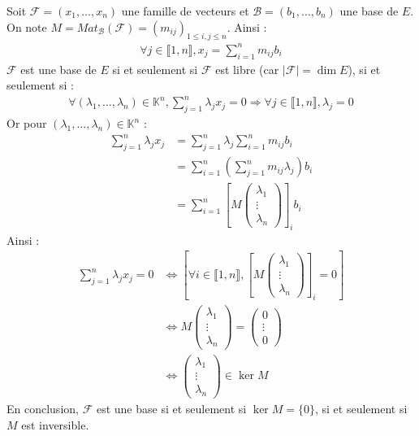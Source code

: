 \documentclass[../main.tex]{subfiles}
\begin{document}
\noindent Soit $\mathcal{F} = (x_1, \ldots, x_n)$ une famille de vecteurs et $\mathcal{B} = (b_1, \ldots, b_n)$ une base de $E$. \\
On note $M = Mat_{\mathcal{B}}(\mathcal{F}) = (m_{ij})_{1\leq i,j\leq n}$. Ainsi :
\begin{align*}
    \forall j\in \llbracket 1, n \rrbracket, x_j = \sum_{i=1}^n m_{ij} b_i
\end{align*}
$\mathcal{F}$ est une base de $E$ si et seulement si $\mathcal{F}$ est libre (car $|\mathcal{F}| = \dim E$), si et seulement si : 
\begin{align*}
    \forall (\lambda_1, \ldots, \lambda_n)\in \mathbb{K}^n, \sum_{j=1}^n \lambda_j x_j = 0 \Rightarrow \forall j\in \llbracket 1, n \rrbracket, \lambda_j = 0
\end{align*}
Or pour $(\lambda_1, \ldots, \lambda_n)\in \mathbb{K}^n$ : 
\begin{align*}
    \sum_{j=1}^{n} \lambda_j x_j &= \sum_{j=1}^n \lambda_j \sum_{i=1}^n m_{ij} b_i \\
    &= \sum_{i=1}^{n} \left( \sum_{j=1}^n m_{ij} \lambda_j \right) b_i \\
    &= \sum_{i=1}^{n} \left[ M \begin{pmatrix}
        \lambda_1 \\
        \vdots \\
        \lambda_n
    \end{pmatrix} \right]_i b_i
\end{align*}
Ainsi : 
\begin{align*}
    \sum_{j=1}^{n} \lambda_j x_j = 0 &\Leftrightarrow \left[ \forall i\in \llbracket 1, n \rrbracket, \left[ M \begin{pmatrix}
        \lambda_1 \\
        \vdots \\
        \lambda_n
    \end{pmatrix} \right]_i = 0 \right] \\
    &\Leftrightarrow M \begin{pmatrix}
        \lambda_1 \\
        \vdots \\
        \lambda_n
    \end{pmatrix} = \begin{pmatrix}
        0 \\
        \vdots \\
        0
    \end{pmatrix} \\
    &\Leftrightarrow \begin{pmatrix}
        \lambda_1 \\
        \vdots \\
        \lambda_n
    \end{pmatrix} \in \ker M
\end{align*}
En conclusion, $\mathcal{F}$ est une base si et seulement si $\ker M = \{0\}$, si et seulement si $M$ est inversible. 
\end{document}
